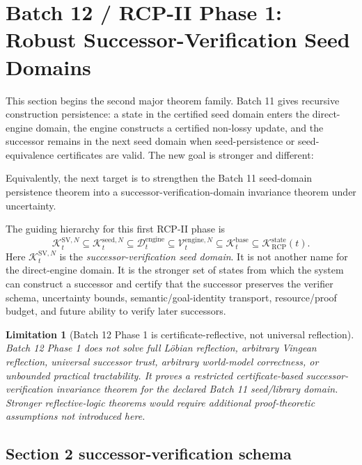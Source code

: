 \documentclass[11pt]{article}
\newtheorem{limitation}[theorem]{Limitation}
\newcommand{\K}{\mathcal{K}}
\newcommand{\1}{\mathbf{1}}
\newcommand{\RCP}{\mathrm{RCP}}
\newcommand{\state}{\mathrm{state}}
\providecommand{\Dcal}{\mathcal{D}}
\providecommand{\Kcal}{\mathcal{K}}
\providecommand{\Vcal}{\mathcal{V}}
\begin{document}
\section{Batch 12 / RCP-II Phase 1: Robust Successor-Verification Seed Domains}
\label{sec:batch12_successor_verification_seed_domains}

This section begins the second major theorem family.  Batch 11 gives recursive construction persistence: a state in the certified seed domain enters the direct-engine domain, the engine constructs a certified non-lossy update, and the successor remains in the next seed domain when seed-persistence or seed-equivalence certificates are valid.  The new goal is stronger and different:
\begin{center}
\end{center}
Equivalently, the next target is to strengthen the Batch 11 seed-domain persistence theorem into a successor-verification-domain invariance theorem under uncertainty.

The guiding hierarchy for this first RCP-II phase is
\[
\boxed{
\Kcal_t^{\mathrm{SV},N}
\subseteq
\Kcal_t^{\mathrm{seed},N}
\subseteq
\Dcal_t^{\mathrm{engine}}
\subseteq
\Vcal_t^{\mathrm{engine},N}
\subseteq
\Kcal_t^{\mathrm{base}}
\subseteq
\K_{\RCP}^{\state}(t).
}
\]
Here \(\Kcal_t^{\mathrm{SV},N}\) is the \emph{successor-verification seed domain}.  It is not another name for the direct-engine domain.  It is the stronger set of states from which the system can construct a successor and certify that the successor preserves the verifier schema, uncertainty bounds, semantic/goal-identity transport, resource/proof budget, and future ability to verify later successors.

\begin{limitation}[Batch 12 Phase 1 is certificate-reflective, not universal reflection]
Batch 12 Phase 1 does not solve full L\"obian reflection, arbitrary Vingean reflection, universal successor trust, arbitrary world-model correctness, or unbounded practical tractability.  It proves a restricted certificate-based successor-verification invariance theorem for the declared Batch 11 seed/library domain.  Stronger reflective-logic theorems would require additional proof-theoretic assumptions not introduced here.
\end{limitation}

\subsection{Section 2 successor-verification schema}
\end{document}
